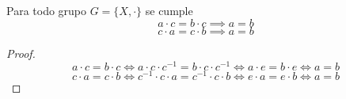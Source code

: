 \begin{thm}
    Para todo grupo $G=\{X,\cdot\}$ se cumple
    \begin{equation}
        a \cdot c = b \cdot c \implies a = b
    \end{equation}
    \begin{equation}
        c \cdot a = c \cdot b \implies a = b
    \end{equation}
\end{thm}

\begin{proof}
    \begin{equation}
        a \cdot c = b \cdot c \iff a \cdot c \cdot c^{-1} = b \cdot c \cdot c^{-1} \iff a \cdot e = b \cdot e \iff a = b  
    \end{equation}
    \begin{equation}
        c \cdot a = c \cdot b \iff c^{-1} \cdot c \cdot a = c^{-1} \cdot c \cdot b \iff e \cdot a = e \cdot b \iff a = b  
    \end{equation}
\end{proof}

